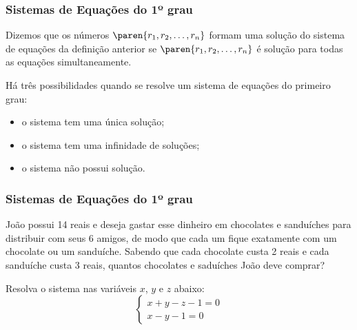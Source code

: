     

    \begin{frame}
        \frametitle{Sistemas de Equações do 1º grau} 
    
        Dizemos que os números $\paren{r_1, r_2, \dots , r_n}$ formam uma solução do sistema de equações da definição anterior se  $\paren{r_1, r_2, \dots , r_n}$ é solução para todas as equações simultaneamente.

        Há três possibilidades quando se resolve um sistema de equações do primeiro grau:
        \begin{itemize}
            \item o sistema tem uma única solução;
            \item o sistema tem uma infinidade de soluções;
            \item o sistema não possui solução.
        \end{itemize}
    
    
    \end{frame}
        
        
        


\begin{frame}
    \frametitle{Sistemas de Equações do 1º grau} 
        
    \begin{exemplo}
        João possui 14 reais e deseja gastar esse dinheiro em chocolates e sanduíches para distribuir com seus 6 amigos, de modo que cada um fique exatamente com um chocolate ou um sanduíche. Sabendo que cada chocolate custa 2 reais e cada sanduíche custa 3 reais, quantos chocolates e saduíches João deve comprar?
    \end{exemplo}\pause

    \begin{exemplo}
        Resolva o sistema nas variáveis $x$, $y$ e $z$ abaixo:
        $$\left\{
        \begin{array}{ll}
        x+y-z-1 = 0 \\
        x-y-1 = 0 
        \end{array} \right.$$
    \end{exemplo}
        
        
\end{frame}
            
